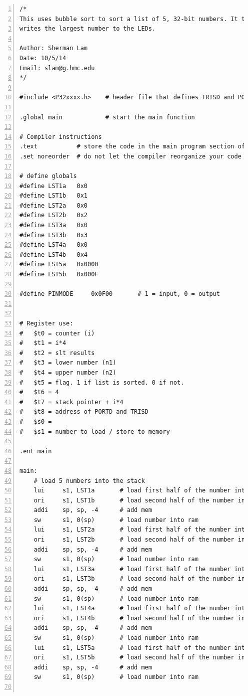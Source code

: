 \documentclass[11pt]{article}
\begin{document}
\begin{lstlisting}[numbers=left,basicstyle=\footnotesize]
/*
This uses bubble sort to sort a list of 5, 32-bit numbers. It then
writes the largest number to the LEDs.

Author: Sherman Lam
Date: 10/5/14
Email: slam@g.hmc.edu
*/

#include <P32xxxx.h>    # header file that defines TRISD and PORTD

.global main            # start the main function

# Compiler instructions
.text           # store the code in the main program section of RAM
.set noreorder  # do not let the compiler reorganize your code

# define globals
#define LST1a   0x0
#define LST1b   0x1
#define LST2a   0x0
#define LST2b   0x2
#define LST3a   0x0
#define LST3b   0x3
#define LST4a   0x0
#define LST4b   0x4
#define LST5a   0x0000
#define LST5b   0x000F

#define PINMODE     0x0F00       # 1 = input, 0 = output


# Register use:
#   $t0 = counter (i)
#   $t1 = i*4
#   $t2 = slt results
#   $t3 = lower number (n1)
#   $t4 = upper number (n2)
#   $t5 = flag. 1 if list is sorted. 0 if not.
#   $t6 = 4
#   $t7 = stack pointer + i*4
#   $t8 = address of PORTD and TRISD
#   $s0 = 
#   $s1 = number to load / store to memory

.ent main

main:
    # load 5 numbers into the stack
    lui     s1, LST1a       # load first half of the number into reg
    ori     s1, LST1b       # load second half of the number into reg
    addi    sp, sp, -4      # add mem
    sw      s1, 0(sp)       # load number into ram
    lui     s1, LST2a       # load first half of the number into reg
    ori     s1, LST2b       # load second half of the number into reg
    addi    sp, sp, -4      # add mem
    sw      s1, 0(sp)       # load number into ram
    lui     s1, LST3a       # load first half of the number into reg
    ori     s1, LST3b       # load second half of the number into reg
    addi    sp, sp, -4      # add mem
    sw      s1, 0(sp)       # load number into ram
    lui     s1, LST4a       # load first half of the number into reg
    ori     s1, LST4b       # load second half of the number into reg
    addi    sp, sp, -4      # add mem
    sw      s1, 0(sp)       # load number into ram
    lui     s1, LST5a       # load first half of the number into reg
    ori     s1, LST5b       # load second half of the number into reg
    addi    sp, sp, -4      # add mem
    sw      s1, 0(sp)       # load number into ram


\end{lstlisting}
\end{document}
